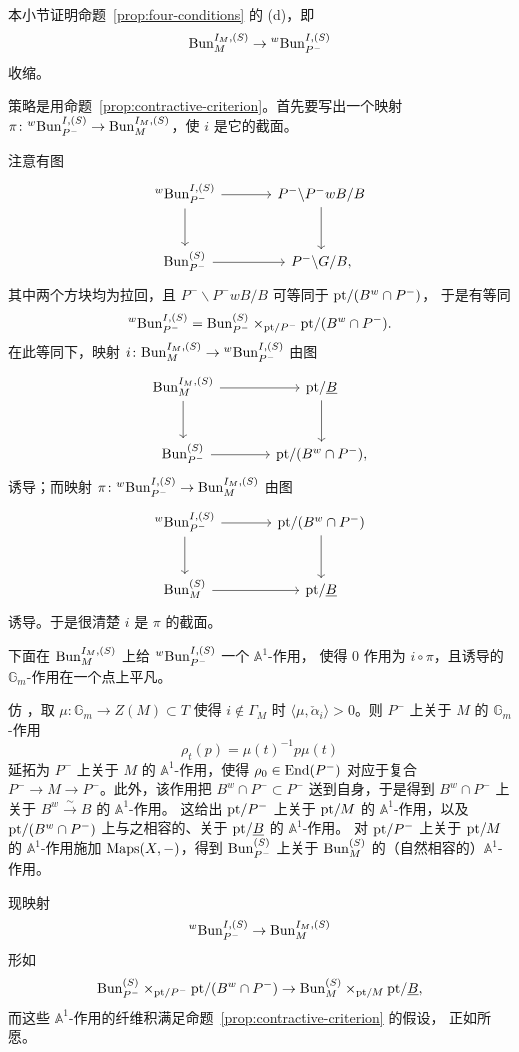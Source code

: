 本小节证明命题~\ref{prop:four-conditions} 的 (d)，即
\[
\mathrm{Bun}^{I_M,(S)}_M\to {}^{w}\mathrm{Bun}^{I,(S)}_{P^-}
\]
收缩。

策略是用命题~\ref{prop:contractive-criterion}。首先要写出一个映射
$\pi\colon {}^{w}\mathrm{Bun}^{I,(S)}_{P^-}\to \mathrm{Bun}^{I_M,(S)}_M$，使 $i$ 是它的截面。

注意有图
\[
\begin{tikzcd}[column sep=large,row sep=large]
{}^{w}\Bun^{I,(S)}_{P^-} \arrow[r] \arrow[d] & P^-\backslash P^-wB/B \arrow[d]\\
\Bun^{(S)}_{P^-} \arrow[r] & P^-\backslash G/B,
\end{tikzcd}
\]
其中两个方块均为拉回，且 $P^-\backslash P^-wB/B$ 可等同于 $\mathrm{pt}/(B^w\cap P^-)$，
于是有等同
\[
{}^{w}\mathrm{Bun}^{I,(S)}_{P^-}
=\mathrm{Bun}^{(S)}_{P^-}\times_{\mathrm{pt}/P^-}\mathrm{pt}/(B^w\cap P^-).
\]
在此等同下，映射 $i\colon \mathrm{Bun}^{I_M,(S)}_M\to {}^{w}\mathrm{Bun}^{I,(S)}_{P^-}$ 由图
\[
\begin{tikzcd}[column sep=large,row sep=large]
\Bun^{I_M,(S)}_M \arrow[r] \arrow[d] & \pt/\uB \arrow[d]\\
\Bun^{(S)}_{P^-} \arrow[r] & \pt/(B^w\cap P^-),
\end{tikzcd}
\]
诱导；而映射 $\pi\colon {}^{w}\mathrm{Bun}^{I,(S)}_{P^-}\to \mathrm{Bun}^{I_M,(S)}_M$ 由图
\[
\begin{tikzcd}[column sep=large,row sep=large]
{}^{w}\Bun^{I,(S)}_{P^-} \arrow[r] \arrow[d] & \pt/(B^w\cap P^-) \arrow[d]\\
\Bun^{(S)}_M \arrow[r] & \pt/\uB
\end{tikzcd}
\]
诱导。于是很清楚 $i$ 是 $\pi$ 的截面。

下面在 $\mathrm{Bun}^{I_M,(S)}_M$ 上给 ${}^{w}\mathrm{Bun}^{I,(S)}_{P^-}$ 一个 $\mathbb{A}^1$-作用，
使得 $0$ 作用为 $i\circ\pi$，且诱导的 $\mathbb{G}_m$-作用在一个点上平凡。

仿 \cite[11.2 小节]{DG15}，取 $\mu\colon \mathbb{G}_m\to Z(M)\subset T$ 使得
$i\notin \Gamma_M$ 时 $\langle\mu,\check\alpha_i\rangle>0$。则 $P^-$ 上关于 $M$ 的
$\mathbb{G}_m$-作用
\[
\rho_t(p)=\mu(t)^{-1}p\mu(t)
\]
延拓为 $P^-$ 上关于 $M$ 的 $\mathbb{A}^1$-作用，使得 $\rho_0\in \operatorname{End}(P^-)$ 对应于复合
$P^-\to M\to P^-$。此外，该作用把 $B^w\cap P^-\subset P^-$ 送到自身，于是得到
$B^w\cap P^-$ 上关于 $B^w\xrightarrow{\sim}B$ 的 $\mathbb{A}^1$-作用。
这给出 $\mathrm{pt}/P^-$ 上关于 $\mathrm{pt}/M$ 的 $\mathbb{A}^1$-作用，以及
$\mathrm{pt}/(B^w\cap P^-)$ 上与之相容的、关于 $\mathrm{pt}/\underline{B}$ 的 $\mathbb{A}^1$-作用。
对 $\mathrm{pt}/P^-$ 上关于 $\mathrm{pt}/M$ 的 $\mathbb{A}^1$-作用施加 $\operatorname{Maps}(X,-)$，得到
$\mathrm{Bun}^{(S)}_{P^-}$ 上关于 $\mathrm{Bun}^{(S)}_M$ 的（自然相容的）$\mathbb{A}^1$-作用。

现映射
\[
{}^{w}\mathrm{Bun}^{I,(S)}_{P^-}\to \mathrm{Bun}^{I_M,(S)}_M
\]
形如
\[
\mathrm{Bun}^{(S)}_{P^-}\times_{\mathrm{pt}/P^-}\mathrm{pt}/(B^w\cap P^-)
\to \mathrm{Bun}^{(S)}_M\times_{\mathrm{pt}/M}\mathrm{pt}/\underline{B},
\]
而这些 $\mathbb{A}^1$-作用的纤维积满足命题~\ref{prop:contractive-criterion} 的假设，
正如所愿。
